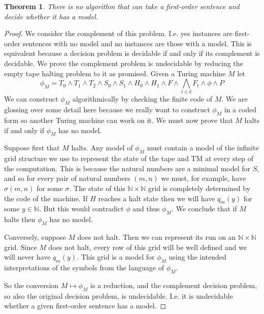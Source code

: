\documentclass{article}
\theoremstyle{plain}
\newtheorem{theorem}{Theorem}[section]{\bfseries}{\itshape}
\theoremstyle{definition}
\begin{document}
\begin{theorem}\label{T:ent}
There is no algorithm that can take a first-order sentence and decide whether it has a model.
\end{theorem}
\begin{proof}
We consider the complement of this problem. I.e. yes instances are first-order sentences with no model and no instances are those with a model. This is equivalent because a decision problem is decidable if and only if its complement is decidable. We prove the complement problem is undecidable by reducing the empty tape halting problem to it as promised. Given a Turing machine $M$ let \[\phi_M = T_0\wedge T_1\wedge T_2 \wedge S_0\wedge S_1\wedge H_0\wedge H_1\wedge F \wedge \bigwedge_{t\in \delta}F_t\wedge \phi\wedge P\]
We can construct $\phi_M$ algorithmically by checking the finite code of $M$. We are glossing over some detail here because we really want to construct $\phi_M$ in a coded form so another Turing machine can work on it. We must now prove that $M$ halts if and only if $\phi_M$ has no model.

Suppose first that $M$ halts. Any model of $\phi_M$ must contain a model of the infinite grid structure we use to represent the state of the tape and TM at every step of the computation. This is because the natural numbers are a minimal model for $S$, and so for every pair of natural numbers $(m,n)$ we must, for example, have $\sigma(m,n)$ for some $\sigma$. The state of this $\mathbb{N}\times\mathbb{N}$ grid is completely determined by the code of the machine. If $H$ reaches a halt state then we will have $q_m(y)$ for some $y\in\mathbb{N}$. But this would contradict $\phi$ and thus $\phi_M$. We conclude that if $M$ halts then $\phi_M$ has no model.

Conversely, suppose $M$ does not halt. Then we can represent its run on an $\mathbb{N}\times\mathbb{N}$ grid. Since $M$ does not halt, every row of this grid will be well defined and we will never have $q_m(y)$. This grid is a model for $\phi_M$ using the intended interpretations of the symbols from the language of $\phi_M$.

So the conversion $M\mapsto \phi_M$ is a reduction, and the complement decision problem, so also the original decision problem, is undecidable. I.e. it is undecidable whether a given first-order sentence has a model.
  
\end{proof}   
\end{document}
